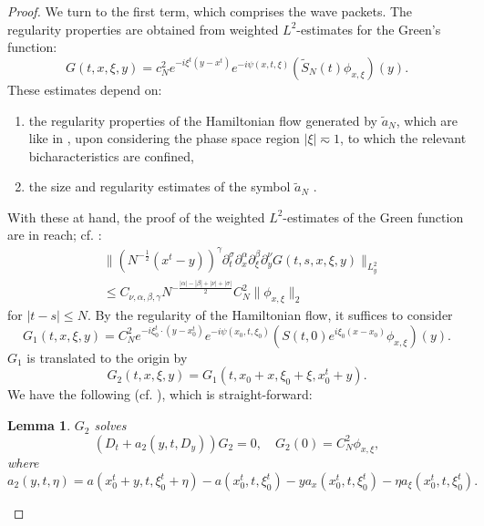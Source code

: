 \documentclass{amsart}
\numberwithin{equation}{section}
\newtheorem{lemma}[theorem]{Lemma}
\theoremstyle{definition}
\begin{document}
\begin{proof}
We turn to the first term, which comprises the wave packets. The regularity properties are obtained from weighted $L^2$-estimates for the Green's function:
\begin{equation*}
G(t,x,\xi,y) = c_N^2 e^{-i \xi^t (y-x^t)} e^{-i \psi(x,t,\xi)} (\tilde{S}_N(t) \phi_{x,\xi})(y).
\end{equation*}
These estimates depend on:
\begin{enumerate}
\item the regularity properties of the Hamiltonian flow generated by $\tilde{a}_N$, which are like in \cite{SchippaTataru2025}, upon considering the phase space region $|\xi| \eqsim 1$, to which the relevant bicharacteristics are confined,
\item the size and regularity estimates of the symbol $\tilde{a}_N$ \cite[Eq.~(4.44)]{SchippaTataru2025}.
\end{enumerate}
With these at hand, the proof of the weighted $L^2$-estimates of the Green function are in reach; cf. \cite[Eq.~(4.46)]{SchippaTataru2025}:
\[
\begin{aligned}
    &\| (N^{-\frac{1}{2}} (x^t - y))^{\gamma} \partial_t^{\sigma} \partial_x^{\alpha} \partial_{\xi}^{\beta} \partial_y^{\nu} G(t,s,x,\xi,y) \|_{L^2_y} \\
    &\leq C_{\nu,\alpha,\beta,\gamma} N^{- \frac{|\alpha|-|\beta|+|\nu|+|\sigma|}{2}} C_N^2 \| \phi_{x,\xi} \|_2
\end{aligned}
\]
for $|t-s| \leq N$. By the regularity of the Hamiltonian flow, it suffices to consider
\begin{equation*}
    G_1(t,x,\xi,y) = C_N^2 e^{-i \xi_0^t \cdot (y-x^t_0)} e^{-i \psi(x_0,t,\xi_0)} (S(t,0) e^{i \xi_0 (x-x_0)} \phi_{x,\xi})(y).
\end{equation*}
$G_1$ is translated to the origin by
\begin{equation*}
    G_2(t,x,\xi,y) = G_1(t,x_0+x,\xi_0+\xi,x_0^t+y).
\end{equation*}
We have the following (cf. \cite[Lemma~4.13]{SchippaTataru2025}), which is straight-forward:
\begin{lemma}
    $G_2$ solves
    \begin{equation*}
        (D_t + a_2(y,t,D_y)) G_2 = 0, \quad G_2(0) = C_N^2 \phi_{x,\xi},
    \end{equation*}
    where
    \begin{equation*}
        a_2(y,t,\eta) = a(x_0^t +y,t,\xi_0^t + \eta) - a(x_0^t,t,\xi_0^t) - y a_x(x_0^t,t,\xi_0^t) - \eta a_{\xi}(x_0^t,t,\xi_0^t).

\end{equation*}
\end{lemma}
\end{proof}
\end{document}
